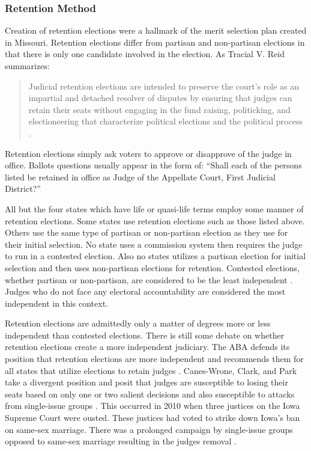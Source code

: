 \documentclass[12pt]{article}
\begin{document}
\subsubsection*{Retention Method}
Creation of retention elections were a hallmark of the merit selection plan created in Missouri. Retention elections differ from partisan and non-partisan elections in that there is only one candidate involved in the election. As Tracial V. Reid  summarizes: \begin{quote}Judicial retention elections are intended to preserve the court’s role as an impartial and detached resolver of disputes by ensuring that judges can retain their seats without engaging in the fund raising, politicking, and electioneering that characterize political elections and the political process \citep{Reid1999}.\end{quote}  Retention elections simply ask voters to approve or disapprove of the judge in office. Ballots questions usually appear in the form of: ``Shall each of the persons listed be retained in office as Judge of the Appellate Court, First Judicial District?''

All but the four states which have life or quasi-life terms employ some manner of retention elections. Some states use retention elections such as those listed above. Others use the same type of partisan or non-partisan election as they use for their initial selection. No state uses a commission system then requires the judge to run in a contested election. Also no states utilizes a partisan election for initial selection and then uses non-partisan elections for retention.  Contested elections, whether partisan or non-partisan, are considered to be the least independent \citep{Choi2010,ABA2003,Canes-Wrone2012}. Judges who do not face any electoral accountability are considered the most independent in this context.

Retention elections are admittedly only a matter of degrees more or less independent than contested elections. There is still some debate on whether retention elections create a more independent judiciary. The ABA defends its position that retention elections are more independent and recommends them for all states that utilize elections to retain judges \citep{ABA2003}.  Canes-Wrone, Clark, and Park take a divergent position and posit that judges are susceptible to losing their seats based on only one or two salient decisions and also susceptible to attacks from single-issue groups \citep{Canes-Wrone2012}.  This occurred in 2010 when three justices on the Iowa Supreme Court were ousted. These justices had voted to strike down Iowa’s ban on same-sex marriage. There was a prolonged campaign by single-issue groups opposed to same-sex marriage resulting in the judges removal \citep{Iowa2010}.
\end{document}
